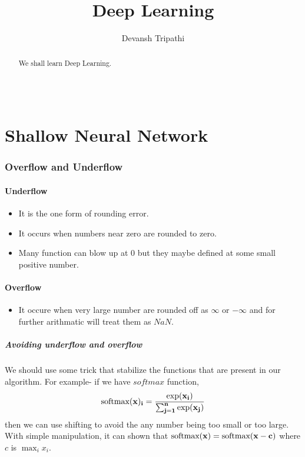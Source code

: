 \documentclass[12pt,reqno]{amsart}
\title{Deep Learning}
\author{Devansh Tripathi}
\theoremstyle{plain}
\theoremstyle{definition}
\begin{document}
\begin{abstract}
    We shall learn Deep Learning.
\end{abstract}
\maketitle
{\large \part{\centering \\ Shallow Neural Network}} %

\section{Overflow and Underflow}\label{overflow-and-underflow}

\subsection{Underflow}\label{underflow}

\begin{itemize}
    \item It is the one form of rounding error.
    \item It occurs when numbers near zero are rounded to zero.
    \item Many function can blow up at \(0\) but they maybe defined at some small positive number.
\end{itemize}

\subsection{Overflow}\label{overflow}

\begin{itemize}
    \item It occure when very large number are rounded off as \(\infty\) or \(-\infty\) and for further arithmatic will treat them as \(NaN\).
\end{itemize}

\subsubsection{Avoiding underflow and
overflow}\label{avoiding-underflow-and-overflow}

We should use some trick that stabilize the functions that are present in our algorithm. For example- if we have \(softmax\) function,
\[ \text{softmax}(\bf{x})_i = \frac{\exp(x_i)}{\sum_{j=1}^n \exp(x_j)}\]
then we can use shifting to avoid the any number being too small or too
large. With simple manipulation, it can shown that
\(\text{softmax}(\bf{x}) = \text{softmax}(\bf{x} - c)\) where \(c\) is
\(\max_i x_i\).
\end{document}
